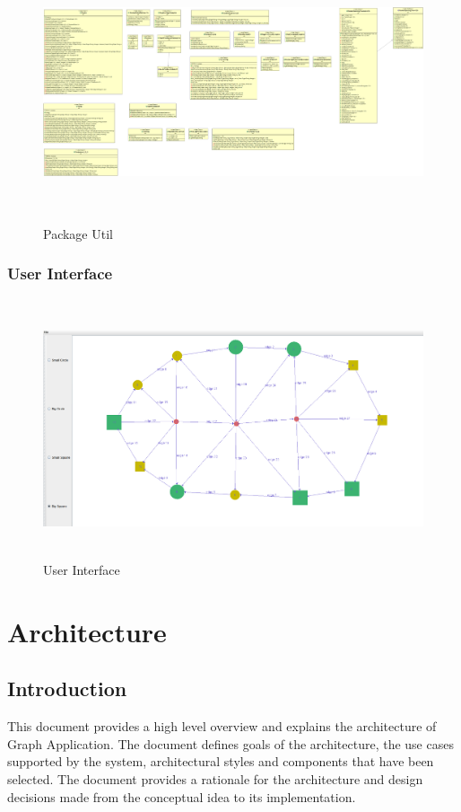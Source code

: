 \documentclass[a4paper,10pt]{article}
\begin{document}
	\begin{figure}[H]
		\centering
		\includegraphics[height = 3in]{4packageutil.png}
		\caption[Optional caption]{Package Util}
		\label{fig:1main}
	\end{figure}
\subsubsection{User Interface}
\begin{figure}[H]
		\centering
		\includegraphics[height = 3in]{graph.png}
		\caption[Optional caption]{User Interface}
		\label{fig:1main}
	\end{figure}
%
\section{Architecture}
\subsection{Introduction}
This document provides a high level overview and explains the architecture of Graph Application.
The document defines goals of the architecture, the use cases supported by the system, architectural styles and components that have been selected. The document provides a rationale for the architecture and design decisions made from the conceptual idea to its implementation. 
\end{document}
